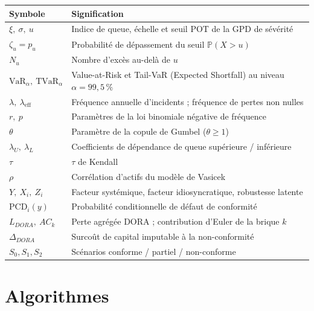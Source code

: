 \documentclass[11pt,a4paper]{article}
\theoremstyle{navystyle}
\theoremstyle{navydef}
\newcommand{\Prob}{\mathbb{P}}
\newcommand{\VaR}{\mathrm{VaR}}
\newcommand{\TVaR}{\mathrm{TVaR}}
\begin{document}
\renewcommand{\arraystretch}{1.25}
\begin{center}
\begin{tabular}{>{\raggedright}p{3cm} >{\raggedright\arraybackslash}p{11.5cm}}
\toprule
\rowcolor{lightblue}
\textbf{Symbole} & \textbf{Signification} \\
\midrule
$\xi,\ \sigma,\ u$ & Indice de queue, échelle et seuil POT de la GPD de sévérité \\
$\zeta_u=p_u$ & Probabilité de dépassement du seuil $\Prob(X>u)$ \\
$N_u$ & Nombre d'excès au-delà de $u$ \\
$\VaR_\alpha,\ \TVaR_\alpha$ & Value-at-Risk et Tail-VaR (Expected Shortfall) au niveau $\alpha=99{,}5\,\%$ \\
$\lambda,\ \lambda_{\text{eff}}$ & Fréquence annuelle d'incidents ; fréquence de pertes non nulles \\
$r,\ p$ & Paramètres de la loi binomiale négative de fréquence \\
$\theta$ & Paramètre de la copule de Gumbel ($\theta\ge1$) \\
$\lambda_U,\ \lambda_L$ & Coefficients de dépendance de queue supérieure / inférieure \\
$\tau$ & $\tau$ de Kendall \\
$\rho$ & Corrélation d'actifs du modèle de Vasicek \\
$Y,\ X_i,\ Z_i$ & Facteur systémique, facteur idiosyncratique, robustesse latente \\
$\mathrm{PCD}_i(y)$ & Probabilité conditionnelle de défaut de conformité \\
$L_{DORA},\ AC_k$ & Perte agrégée DORA ; contribution d'Euler de la brique $k$ \\
$\Delta_{DORA}$ & Surcoût de capital imputable à la non-conformité \\
$S_0,S_1,S_2$ & Scénarios conforme / partiel / non-conforme \\
\bottomrule
\end{tabular}
\end{center}

\clearpage
\section{Algorithmes}
\label{ann:algos}
\end{document}
